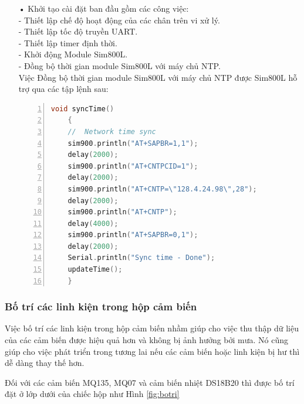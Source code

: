 \begin{itemize}
	\item[•]Khởi tạo cài đặt ban đầu gồm các công việc: \\
	- Thiết lập chế độ hoạt động của các chân trên vi xử lý.\\
	- Thiết lập tốc độ truyền UART.\\
	- Thiết lập timer định thời.\\
	- Khởi động Module Sim800L.\\
	- Đồng bộ thời gian module Sim800L với máy chủ NTP.\\
	Việc Đồng bộ thời gian module Sim800L với máy chủ NTP được Sim800L hỗ trợ qua các tập lệnh sau:
	\begin{lstlisting}[numbers=left,firstnumber=1,language=C]
	void syncTime()
	{
	//  Network time sync
	sim900.println("AT+SAPBR=1,1");
	delay(2000);
	sim900.println("AT+CNTPCID=1");
	delay(2000);
	sim900.println("AT+CNTP=\"128.4.24.98\",28");
	delay(2000);
	sim900.println("AT+CNTP");
	delay(4000);  
	sim900.println("AT+SAPBR=0,1");
	delay(2000);
	Serial.println("Sync time - Done");
	updateTime();
	}
	\end{lstlisting}
	
\end{itemize}



\subsubsection*{Bố trí các linh kiện trong hộp cảm biến}
Việc bố trí các linh kiện trong hộp cảm biến nhầm giúp cho việc thu thập dữ liệu của các cảm biến được hiệu quả hơn và không bị ảnh hưởng bởi mưa. Nó cũng giúp cho việc phát triển trong tương lai nếu các cảm biến hoặc linh kiện bị hư thì dễ dàng thay thế hơn.

Đối với các cảm biến MQ135, MQ07 và cảm biến nhiệt DS18B20 thì được bố trí đặt ở lớp dưới của chiếc hộp như Hình \ref{fig:botri}

